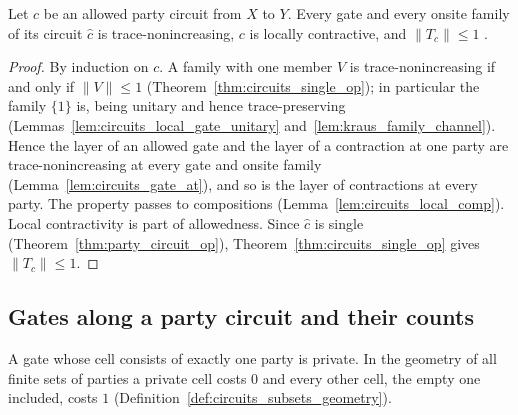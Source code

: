\begin{theorem}
    \label{thm:party_op_contraction}
    \leanok
    Let $c$ be an allowed party circuit from $X$ to $Y$. Every gate and every onsite
    family of its circuit $\widehat c$ is trace-nonincreasing, $c$ is locally
    contractive, and $\lVert T_c\rVert\le1$
    \cite[Section~5.1]{OpenAI2026PolynomialPEPS}.
\end{theorem}
\begin{proof}\leanok
    By induction on $c$. A family with one member $V$ is trace-nonincreasing if and
    only if $\lVert V\rVert\le1$ (Theorem~\ref{thm:circuits_single_op}); in
    particular the family $\{1\}$ is, being unitary and hence trace-preserving
    (Lemmas~\ref{lem:circuits_local_gate_unitary} and~\ref{lem:kraus_family_channel}).
    Hence the layer of an allowed gate and the layer of a contraction at one party are
    trace-nonincreasing at every gate and onsite family
    (Lemma~\ref{lem:circuits_gate_at}), and so is the layer of contractions at every
    party. The property passes to compositions (Lemma~\ref{lem:circuits_local_comp}).
    Local contractivity is part of allowedness. Since $\widehat c$ is single
    (Theorem~\ref{thm:party_circuit_op}), Theorem~\ref{thm:circuits_single_op} gives
    $\lVert T_c\rVert\le1$.
\end{proof}

\subsection{Gates along a party circuit and their counts}
\label{sec:party_syntax_counts}

A gate whose cell consists of exactly one party is private. In the geometry of all
finite sets of parties a private cell costs $0$ and every other cell, the empty one
included, costs $1$ (Definition~\ref{def:circuits_subsets_geometry}).

